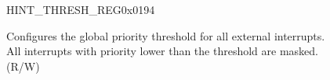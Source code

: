 \begin{register}{H}{INT\_THRESH\_REG}{0x0194}\label{regdesc:INTTHRESHREG}
%
%
\regnewline%
\begin{regdesc}
\begin{reglist}
\label{fielddesc:INTTHRESH}\item [INT\_THRESH] Configures the global priority threshold for all external interrupts. \\
All interrupts with priority lower than the threshold are masked. \\
(R/W)
\end{reglist}
\end{regdesc}
\end{register}
